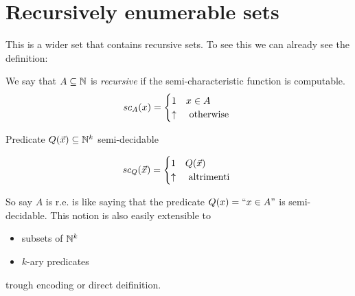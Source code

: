 \chapter{Recursively enumerable sets}
This is a wider set that contains recursive sets. To see this we can
already see the definition:

\begin{definition}
  We say that $ A \subseteq \mathbb{N} $ is \emph{recursive} if
  the semi-characteristic function is computable.
  \begin{equation*}
    sc_A(x) = \begin{cases} 1 & x \in A \\ \uparrow & $
      otherwise $
    \end{cases}
  \end{equation*}

  Predicate $ Q(\vec{x}) \subseteq \mathbb{N}^k $ semi-decidable

  \begin{equation*} sc_Q(\vec{x}) = \begin{cases} 1 & Q(\vec{x}) \\
      \uparrow & $ altrimenti $
    \end{cases}
  \end{equation*}
\end{definition}

So say $A$ is r.e. is like saying that the predicate $ Q(x)=``x \in A"
$ is semi-decidable. This notion is also easily extensible to
\begin{itemize}
\item subsets of $\mathbb{N}^k$
\item $k$-ary predicates
\end{itemize}
trough encoding or direct deifinition.

